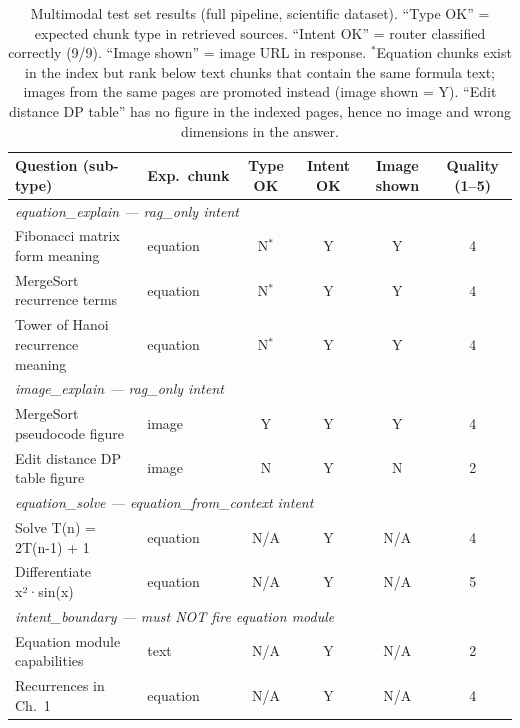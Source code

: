 \documentclass[12pt,a4paper]{article}
\begin{document}
\begin{table}[H]
  \centering
  \caption{Multimodal test set results (full pipeline, scientific dataset).
           ``Type OK'' = expected chunk type in retrieved sources.
           ``Intent OK'' = router classified correctly (9/9). ``Image shown'' = image URL in response.
           $^*$Equation chunks exist in the index but rank below text chunks that contain the same formula text;
           images from the same pages are promoted instead (image shown = Y).
           ``Edit distance DP table'' has no figure in the indexed pages, hence no image and wrong dimensions in the answer.}
  \label{tab:results_multimodal}
  \begin{tabular}{llcccc}
    \toprule
    \textbf{Question (sub-type)} & \textbf{Exp.\ chunk} & \textbf{Type OK} & \textbf{Intent OK} & \textbf{Image shown} & \textbf{Quality (1--5)} \\
    \midrule
    \multicolumn{6}{l}{\textit{equation\_explain — rag\_only intent}} \\
    Fibonacci matrix form meaning     & equation & N$^*$ & Y & Y & 4 \\
    MergeSort recurrence terms        & equation & N$^*$ & Y & Y & 4 \\
    Tower of Hanoi recurrence meaning & equation & N$^*$ & Y & Y & 4 \\
    \midrule
    \multicolumn{6}{l}{\textit{image\_explain — rag\_only intent}} \\
    MergeSort pseudocode figure       & image    & Y     & Y & Y & 4 \\
    Edit distance DP table figure     & image    & N     & Y & N & 2 \\
    \midrule
    \multicolumn{6}{l}{\textit{equation\_solve — equation\_from\_context intent}} \\
    Solve T(n) = 2T(n-1) + 1         & equation & N/A   & Y & N/A & 4 \\
    Differentiate x²·sin(x)          & equation & N/A   & Y & N/A & 5 \\
    \midrule
    \multicolumn{6}{l}{\textit{intent\_boundary — must NOT fire equation module}} \\
    Equation module capabilities      & text     & N/A   & Y & N/A & 2 \\
    Recurrences in Ch.\ 1             & equation & N/A   & Y & N/A & 4 \\
    \bottomrule
  \end{tabular}
\end{table}
\end{document}
